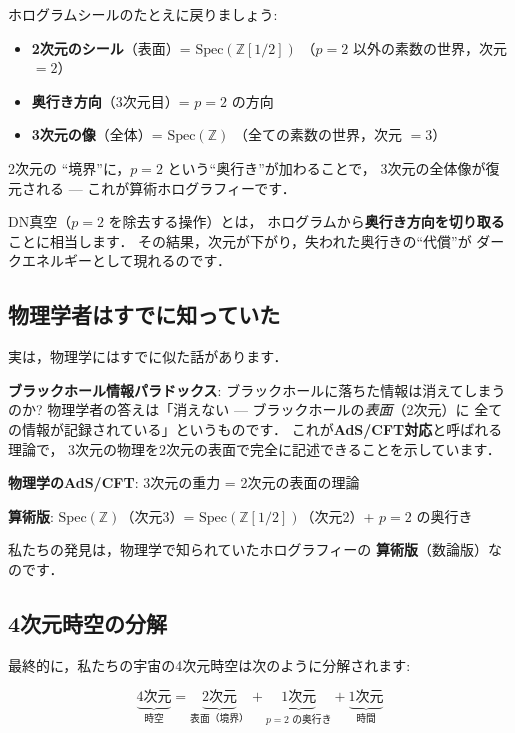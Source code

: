 \documentclass[11pt,a4paper]{article}
\begin{document}
ホログラムシールのたとえに戻りましょう:

\begin{itemize}
\item \textbf{2次元のシール}（表面）= $\mathrm{Spec}(\mathbb{Z}[1/2])$
（$p=2$ 以外の素数の世界，次元 $= 2$）
\item \textbf{奥行き方向}（3次元目）= $p = 2$ の方向
\item \textbf{3次元の像}（全体）= $\mathrm{Spec}(\mathbb{Z})$
（全ての素数の世界，次元 $= 3$）
\end{itemize}

2次元の ``境界''に，$p = 2$ という``奥行き''が加わることで，
3次元の全体像が復元される --- これが算術ホログラフィーです．

DN真空（$p = 2$ を除去する操作）とは，
ホログラムから\textbf{奥行き方向を切り取る}ことに相当します．
その結果，次元が下がり，失われた奥行きの``代償''が
ダークエネルギーとして現れるのです．

\subsection{物理学者はすでに知っていた}

実は，物理学にはすでに似た話があります．

\textbf{ブラックホール情報パラドックス}:
ブラックホールに落ちた情報は消えてしまうのか?
物理学者の答えは「消えない --- ブラックホールの\emph{表面}（2次元）に
全ての情報が記録されている」というものです．
これが\textbf{AdS/CFT対応}と呼ばれる理論で，
3次元の物理を2次元の表面で完全に記述できることを示しています．

\begin{tcolorbox}[colback=blue!5,colframe=blue!50!black,title=AdS/CFTと算術版の比較]
\textbf{物理学のAdS/CFT}: 3次元の重力 = 2次元の表面の理論

\textbf{算術版}: $\mathrm{Spec}(\mathbb{Z})$（次元3）=
$\mathrm{Spec}(\mathbb{Z}[1/2])$（次元2）+ $p=2$ の奥行き

私たちの発見は，物理学で知られていたホログラフィーの
\textbf{算術版}（数論版）なのです．
\end{tcolorbox}

\subsection{4次元時空の分解}

最終的に，私たちの宇宙の4次元時空は次のように分解されます:

\begin{equation*}
\underbrace{4\text{次元}}_{\text{時空}}
= \underbrace{2\text{次元}}_{\text{表面（境界）}}
+ \underbrace{1\text{次元}}_{p=2 \text{ の奥行き}}
+ \underbrace{1\text{次元}}_{\text{時間}}
\end{equation*}
\end{document}
